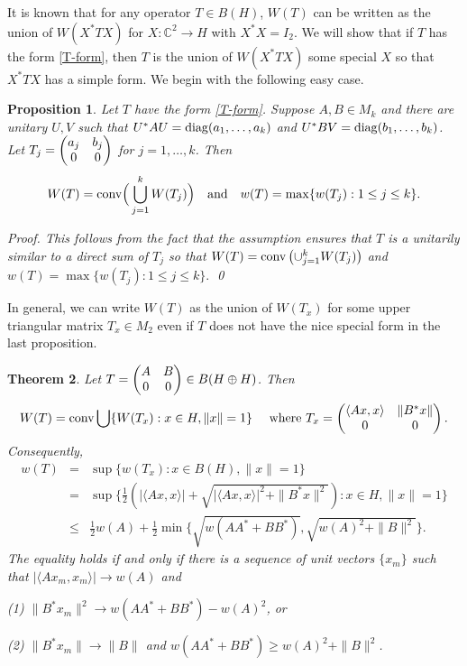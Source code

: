 \documentclass[11pt]{article}
\newtheorem{theorem}{Theorem}[section]
\newtheorem{proposition}[theorem]{Proposition}
\numberwithin{equation}{section}
\def\IC{{\mathbb C}}
\def\la{\langle}
\def\ra{\rangle}
\def\conv{{\rm conv}}
\def\diag{{\rm diag}}
\begin{document}
It is known that for any operator $T \in B(H)$, $W(T)$ can be written as the union
of $W(X^*TX)$ for $X: \IC^2 \rightarrow H$ with $X^*X = I_2$.
We will show that if $T$ has the form \eqref{T-form},
then $T$ is the union of $W(X^*TX)$ some special $X$ so that $X^*TX$ has a simple form.
We begin with the following easy case.


\begin{proposition}  Let $T$ have the form \eqref{T-form}. Suppose $A, B \in M_k$ and there are unitary $U, V$ such that
$U^*AU = \diag(a_1, \dots, a_k)$ and $U^*BV = \diag(b_1, \dots, b_k)$.
Let $T_j = \begin{pmatrix} a_j & b_j \cr 0 & 0 \cr\end{pmatrix}$ for $j = 1, \dots, k$.
Then
$$W(T) = \conv \Big(\bigcup_{j=1}^k W(T_j)\Big) \quad \mbox{and} \quad
w(T) = \max\{ w(T_j): 1 \le  j \le k\}.$$
\end{proposition}

\it Proof. \rm This follows from the fact that the assumption ensures that $T$
is a unitarily similar to a direct sum of $T_j$ so that $W(T)=\conv \left(\cup_{j=1}^k W(T_j)\right)$
and $w(T) = \max \{ w(T_j): 1 \le  j \le k \}.$ \qed



\smallskip
In general, we can write $W(T)$ as the union of $W(T_x)$ for some upper triangular
matrix $T_x \in M_2$ even if $T$ does not have the nice special form in the last proposition.

\begin{theorem}\label{p22}
Let $T = \begin{pmatrix} A & B \cr 0 & 0 \cr\end{pmatrix} \in B(H \oplus H)$.
Then
$$W(T) =\conv  \bigcup \{W(T_x): x \in H, \|x\| = 1\} \quad \hbox{ where } T_x
=  \begin{pmatrix}\la Ax,x\ra & \|B^*x\| \cr 0 & 0 \cr\end{pmatrix}.$$
Consequently,
\begin{eqnarray*}
w(T) &=& \sup \{ w(T_x): x \in B(H), \|x\| = 1\} \\
&=& \sup \{ \frac{1}{2}(|\la Ax, x\ra| + \sqrt{|\la Ax,x\ra|^2 + \|B^*x\|^2}): x \in H, \|x\| = 1\}  \\
&\le& \frac{1}{2}w(A) + \frac{1}{2} \min\{ \sqrt{w(AA^*+ BB^*)}, \sqrt{ w(A)^2 + \|B\|^2}\}.
\end{eqnarray*}
The equality holds if and only if there is a sequence of unit vectors $\{x_m\}$
such that $|\langle Ax_m, x_m\rangle| \rightarrow w(A)$ and

{\rm (1)}  $\|B^*x_m\|^2 \rightarrow  w(AA^*+BB^*) - w(A)^2$, or

{\rm (2)} $\|B^*x_m\| \rightarrow  \|B\|$ and $ w(AA^*+BB^*) \ge w(A)^2 + \|B\|^2$.
\end{theorem}
\end{document}
